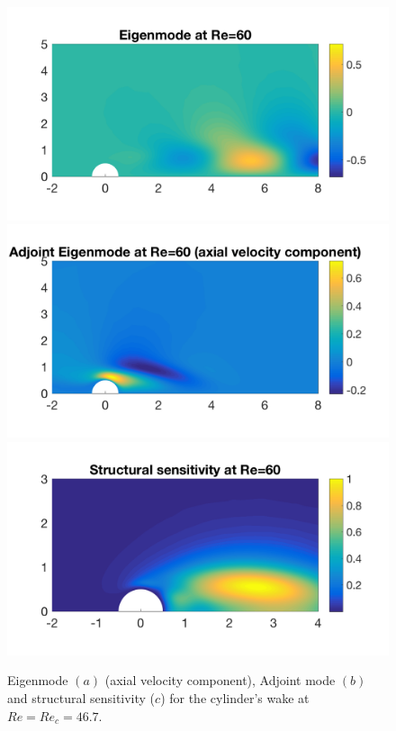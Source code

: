 \documentclass[twocolumn,10pt]{asme2ej}
\begin{document}



\begin{figure}
\includegraphics[width=.9 \linewidth]{Cylinder_EigenModeRe60.png}
\includegraphics[width=.9 \linewidth]{Cylinder_EigenModeAdjRe60.png}
\includegraphics[width=.9 \linewidth]{Cylinder_SensitivityRe60.png}
\caption{Eigenmode $(a)$  (axial velocity component),  Adjoint mode $(b)$ and structural sensitivity ($c$) for the cylinder's wake at $Re=Re_c = 46.7$.}
\label{fig:Eigenmode}
\end{figure}
\end{document}
